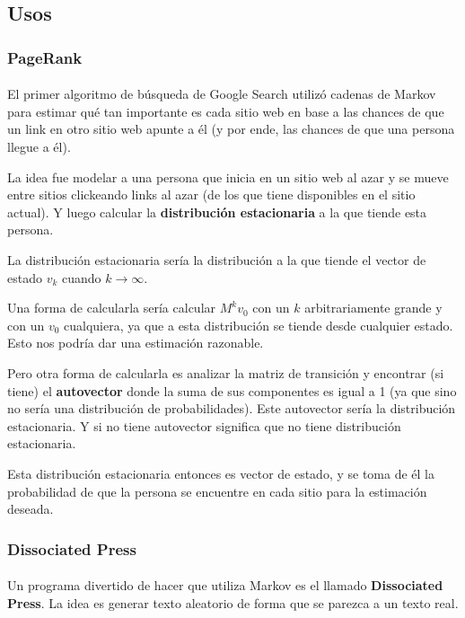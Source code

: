 \documentclass[../main.tex]{subfiles}
\begin{document}
\subsection{Usos}
\subsubsection{PageRank}
\label{seq:markov:pagerank}

\paragraph{} El primer algoritmo de búsqueda de Google Search utilizó cadenas de Markov para estimar qué tan importante es cada sitio web en base a las chances de que un link en otro sitio web apunte a él (y por ende, las chances de que una persona llegue a él).

La idea fue modelar a una persona que inicia en un sitio web al azar y se mueve entre sitios clickeando links al azar (de los que tiene disponibles en el sitio actual). Y luego calcular la \textbf{distribución estacionaria} a la que tiende esta persona.

La distribución estacionaria sería la distribución a la que tiende el vector de estado \(v_{k}\) cuando \(k \rightarrow \infty\).

Una forma de calcularla sería calcular \(M^{k}v_{0}\) con un \(k\) arbitrariamente grande y con un \(v_{0}\) cualquiera, ya que a esta distribución se tiende desde cualquier estado. Esto nos podría dar una estimación razonable.

Pero otra forma de calcularla es analizar la matriz de transición y encontrar (si tiene) el \textbf{autovector} donde la suma de sus componentes es igual a 1 (ya que sino no sería una distribución de probabilidades). Este autovector sería la distribución estacionaria. Y si no tiene autovector significa que no tiene distribución estacionaria.

Esta distribución estacionaria entonces es vector de estado, y se toma de él la probabilidad de que la persona se encuentre en cada sitio para la estimación deseada.

\subsubsection{Dissociated Press}

\paragraph{} Un programa divertido de hacer que utiliza Markov es el llamado \textbf{Dissociated Press}. La idea es generar texto aleatorio de forma que se parezca a un texto real.
\end{document}
